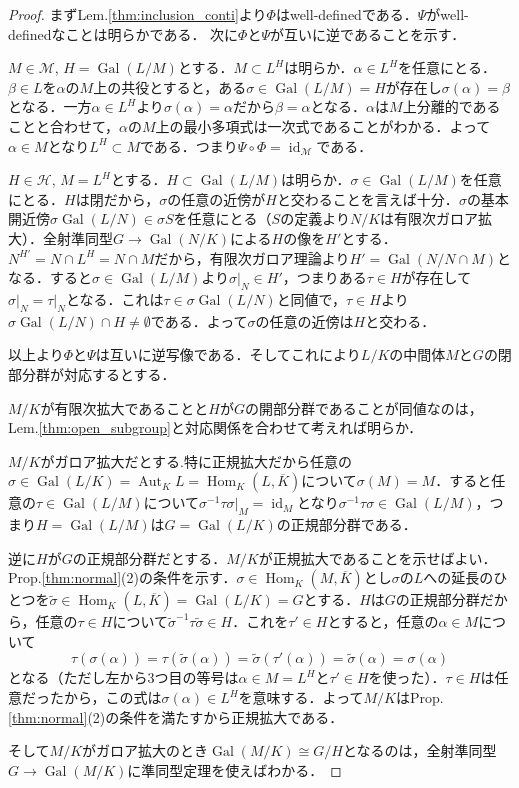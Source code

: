 \documentclass[dvipdfmx,b5paper,papersize]{jsarticle}
\theoremstyle{definition}
\DeclareMathOperator{\Aut}{Aut}
\DeclareMathOperator{\Gal}{Gal}
\DeclareMathOperator{\Hom}{Hom}
\DeclareMathOperator{\id}{id}
\begin{document}
\begin{proof}
  まずLem.\ref{thm:inclusion_conti}より$\Phi$はwell-definedである．$\Psi$がwell-definedなことは明らかである．
  次に$\Phi$と$\Psi$が互いに逆であることを示す．

  $M \in \mathcal{M}$, $H=\Gal(L/M)$とする．$M \subset L^H$は明らか．$\alpha \in L^H$を任意にとる．$\beta \in L$を$\alpha$の$M$上の共役とすると，ある$\sigma \in \Gal(L/M)=H$が存在し$\sigma(\alpha)=\beta$となる．一方$\alpha \in L^H$より$\sigma(\alpha)=\alpha$だから$\beta = \alpha$となる．$\alpha$は$M$上分離的であることと合わせて，$\alpha$の$M$上の最小多項式は一次式であることがわかる．よって$\alpha \in M$となり$L^H \subset M$である．つまり$\Psi \circ \Phi= \id_{\mathcal{M}}$である．

  $H \in \mathcal{H}$, $M=L^H$とする．$H \subset \Gal(L/M)$は明らか．$\sigma \in \Gal(L/M)$を任意にとる．$H$は閉だから，$\sigma$の任意の近傍が$H$と交わることを言えば十分．$\sigma$の基本開近傍$\sigma \Gal(L/N) \in \sigma S$を任意にとる（$S$の定義より$N/K$は有限次ガロア拡大）．全射準同型$G \to \Gal(N/K)$による$H$の像を$H'$とする．$N^{H'}=N \cap L^H=N \cap M$だから，有限次ガロア理論より$H'=\Gal(N/{N \cap M})$となる．すると$\sigma \in \Gal(L/M)$より$\sigma \lvert_N \in H'$，つまりある$\tau \in H$が存在して$\sigma \lvert_N =\tau \lvert_N$となる．これは$\tau \in \sigma \Gal(L/N)$と同値で，$\tau \in H$より$\sigma \Gal(L/N) \cap H \neq \emptyset$である．よって$\sigma$の任意の近傍は$H$と交わる．

  以上より$\Phi$と$\Psi$は互いに逆写像である．そしてこれにより$L/K$の中間体$M$と$G$の閉部分群が対応するとする．

  $M/K$が有限次拡大であることと$H$が$G$の開部分群であることが同値なのは，Lem.\ref{thm:open_subgroup}と対応関係を合わせて考えれば明らか．

  $M/K$がガロア拡大だとする.特に正規拡大だから任意の$\sigma \in \Gal(L/K)=\Aut_K L=\Hom_K(L,\overline{K})$について$\sigma(M)=M$．すると任意の$\tau \in \Gal(L/M)$について$\sigma^{-1} \tau \sigma \lvert_M =\id_M$となり$\sigma^{-1} \tau \sigma \in \Gal(L/M)$，つまり$H=\Gal(L/M)$は$G=\Gal(L/K)$の正規部分群である．

  逆に$H$が$G$の正規部分群だとする．$M/K$が正規拡大であることを示せばよい．Prop.\ref{thm:normal}(2)の条件を示す．$\sigma \in \Hom_K(M,\overline{K})$とし$\sigma$の$L$への延長のひとつを$\tilde{\sigma} \in \Hom_K(L,\overline{K})=\Gal(L/K)=G$とする．$H$は$G$の正規部分群だから，任意の$\tau \in H$について$\tilde{\sigma}^{-1} \tau \tilde{\sigma} \in H$．これを$\tau' \in H$とすると，任意の$\alpha \in M$について
  \[
  \tau(\sigma(\alpha))=\tau(\tilde{\sigma}(\alpha))=\tilde{\sigma}(\tau'(\alpha))=\tilde{\sigma}(\alpha)=\sigma(\alpha)
  \]
  となる（ただし左から3つ目の等号は$\alpha \in M=L^H$と$\tau' \in H$を使った）．$\tau \in H$は任意だったから，この式は$\sigma(\alpha) \in L^H$を意味する．よって$M/K$はProp.\ref{thm:normal}(2)の条件を満たすから正規拡大である．

  そして$M/K$がガロア拡大のとき$\Gal(M/K) \cong G/H$となるのは，全射準同型$G \to \Gal(M/K)$に準同型定理を使えばわかる．
\end{proof}
\end{document}
